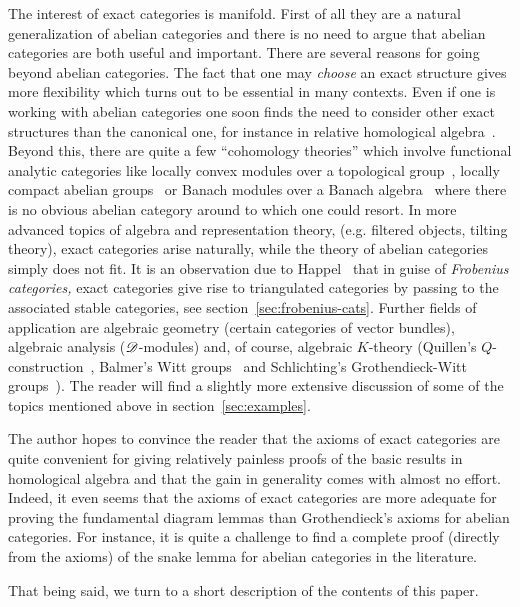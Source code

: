 \documentclass[1p]{elsarticle}
\theoremstyle{mythm}
\theoremstyle{mydef}
\begin{document}
The interest of exact categories is manifold. First of all they are a
natural generalization of abelian categories and there is no need to
argue that abelian categories are both useful and important. There are
several reasons for going beyond abelian categories. The
fact that one may \emph{choose} an exact structure gives more
flexibility which turns out to be essential in many contexts.
Even if one is working with abelian categories one soon
finds the need to consider other exact structures than the canonical
one, for instance in relative homological algebra~\cite{MR0080654}. 
Beyond this, there are quite a few ``cohomology theories'' which
involve functional analytic categories like locally convex modules
over a topological group~\cite{MR0147577,MR1721403},
locally compact abelian groups~\cite{MR2329311} or Banach
modules over a Banach algebra~\cite{MR0417787,MR1093462}
where there is no obvious abelian category around to which one could
resort. In more advanced topics of algebra and representation theory,
(e.g. filtered objects, tilting theory), 
exact categories arise naturally, while the theory of abelian
categories simply does not fit. 
It is an observation due to Happel~\cite{MR935124} that in guise of 
\emph{Frobenius categories,} exact categories give rise to
triangulated categories by passing to the associated stable
categories, see section~\ref{sec:frobenius-cats}.
Further fields of application are
algebraic geometry (certain categories of vector bundles), algebraic
analysis ($\operatorname{\mathscr{D}}$-modules) and, of course, algebraic $K$-theory
(Quillen's $Q$-construction~\cite{MR0338129}, 
Balmer's Witt groups~\cite{MR2181829} and Schlichting's
Grothendieck-Witt groups~\cite{schlichting}).
The reader will find a slightly more extensive
discussion of some of the topics mentioned above in
section~\ref{sec:examples}.


The author hopes to convince the reader that the axioms of exact
categories are quite convenient for giving relatively painless proofs
of the basic results in homological algebra and that the gain in
generality comes with almost no effort. Indeed, it even seems that the
axioms of exact categories are more adequate for proving the
fundamental diagram lemmas than Grothendieck's axioms for abelian
categories. For instance, it is quite a challenge to find a complete
proof (directly from the axioms) of the snake lemma for abelian
categories in the literature.


That being said, we turn to a short description of the contents of
this paper.
\end{document}

